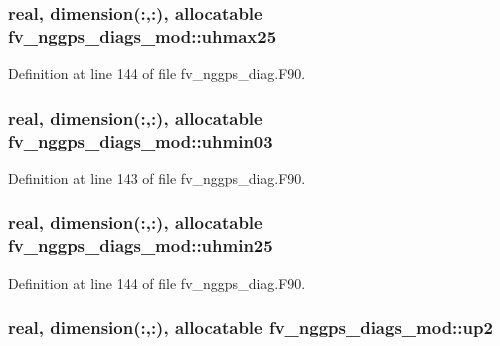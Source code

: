 \subsubsection[{uhmax25}]{\setlength{\rightskip}{0pt plus 5cm}real, dimension(\-:,\-:), allocatable fv\-\_\-nggps\-\_\-diags\-\_\-mod\-::uhmax25\hspace{0.3cm}{\ttfamily [private]}}\label{classfv__nggps__diags__mod_ad0c2b22c16b4343ee02a0da7770b1189}


Definition at line 144 of file fv\-\_\-nggps\-\_\-diag.\-F90.

\subsubsection[{uhmin03}]{\setlength{\rightskip}{0pt plus 5cm}real, dimension(\-:,\-:), allocatable fv\-\_\-nggps\-\_\-diags\-\_\-mod\-::uhmin03\hspace{0.3cm}{\ttfamily [private]}}\label{classfv__nggps__diags__mod_aeb25900a2ec78b17f30b044f0dab51fa}


Definition at line 143 of file fv\-\_\-nggps\-\_\-diag.\-F90.

\subsubsection[{uhmin25}]{\setlength{\rightskip}{0pt plus 5cm}real, dimension(\-:,\-:), allocatable fv\-\_\-nggps\-\_\-diags\-\_\-mod\-::uhmin25\hspace{0.3cm}{\ttfamily [private]}}\label{classfv__nggps__diags__mod_a517b0627b47ddc6de2c53f9f13974730}


Definition at line 144 of file fv\-\_\-nggps\-\_\-diag.\-F90.

\subsubsection[{up2}]{\setlength{\rightskip}{0pt plus 5cm}real, dimension(\-:,\-:), allocatable fv\-\_\-nggps\-\_\-diags\-\_\-mod\-::up2\hspace{0.3cm}{\ttfamily [private]}}\label{classfv__nggps__diags__mod_aad395c43512c289616cfe7c63927fe51}


